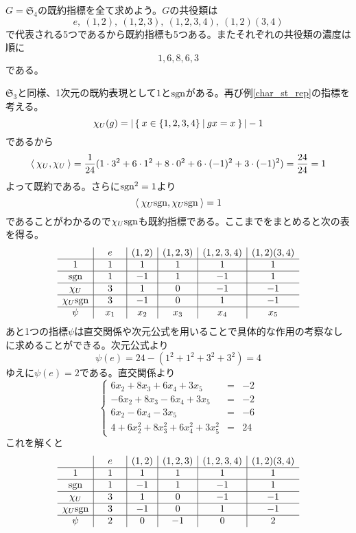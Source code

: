 \documentclass{ltjsreport}
\begin{document}
\begin{eg}
  $G=\mathfrak{S}_4$の既約指標を全て求めよう。$G$の共役類は
  \[
  e,\:(1,2),\:(1,2,3),\:(1,2,3,4),\:(1,2)(3,4)  
  \]
  で代表される5つであるから既約指標も5つある。またそれぞれの共役類の濃度は順に
  \[
  1,6,8,6,3  
  \]
  である。
  
  $\mathfrak{S}_3$と同様、1次元の既約表現として$1$と$\mathrm{sgn}$がある。再び例\ref{char_st_rep}の指標を考える。
  \[
  \chi_U(g)=|\left\{\:x\in\{1,2,3,4\}\:\middle|\:gx=x\:\right\}|-1  
  \]
  であるから
  \[
  \langle\:\chi_U,\chi_U\:\rangle=\frac{1}{24}(1\cdot 3^2+6\cdot 1^2+8\cdot 0^2+6\cdot (-1)^2+3\cdot(-1)^2)=\frac{24}{24}=1 
  \]
  よって既約である。さらに$\mathrm{sgn}^2=1$より
  \[
  \langle\:\chi_U\mathrm{sgn},\chi_U\mathrm{sgn}\:\rangle=1 
  \]
  であることがわかるので$\chi_U\mathrm{sgn}$も既約指標である。ここまでをまとめると次の表を得る。
  \[
    \begin{array}{c|c|c|c|c|c}
  
           & \quad e\quad & (1,2) & (1,2,3) & (1,2,3,4) & (1,2)(3,4)\\
      \hline
      1    & 1 &   1   &    1    &     1     &      1    \\
      \hline
      \mathrm{sgn} & 1 &   -1  &    1    &     -1    &      1   \\
      \hline
      \chi_U & 3 &   1   &    0    &     -1    &      -1  \\
      \hline
      \chi_U\mathrm{sgn} & 3 & -1 &   0    &     1    &     -1  \\
      \hline
      \psi       &  x_1  & x_2 & x_3 &   x_4    &     x_5     
    \end{array}
  \]
  あと1つの指標$\psi$は直交関係や次元公式を用いることで具体的な作用の考察なしに求めることができる。次元公式より
  \[
  \psi(e)=24-(1^2+1^2+3^2+3^2)=4  
  \]
  ゆえに$\psi(e)=2$である。直交関係より
  \[
  \left\{\begin{array}{ccc}
    6x_2+8x_3+6x_4+3x_5 & = & -2\\
    -6x_2+8x_3-6x_4+3x_5 & = & -2\\
    6x_2-6x_4-3x_5 & = & -6\\
    4+6x_2^2+8x_3^2+6x_4^2+3x_5^2 &= &24
  \end{array}\right.  
  \]
  これを解くと
  \[
    \begin{array}{c|c|c|c|c|c}
  
           & \quad e\quad & (1,2) & (1,2,3) & (1,2,3,4) & (1,2)(3,4)\\
      \hline
      1    & 1 &   1   &    1    &     1     &      1    \\
      \hline
      \mathrm{sgn} & 1 &   -1  &    1    &     -1    &      1   \\
      \hline
      \chi_U & 3 &   1   &    0    &     -1    &      -1  \\
      \hline
      \chi_U\mathrm{sgn} & 3 & -1 &   0    &     1    &     -1  \\
      \hline
      \psi       &  2  & 0 & -1 &   0 &     2     
    \end{array}
  \]


\end{eg}
\end{document}
